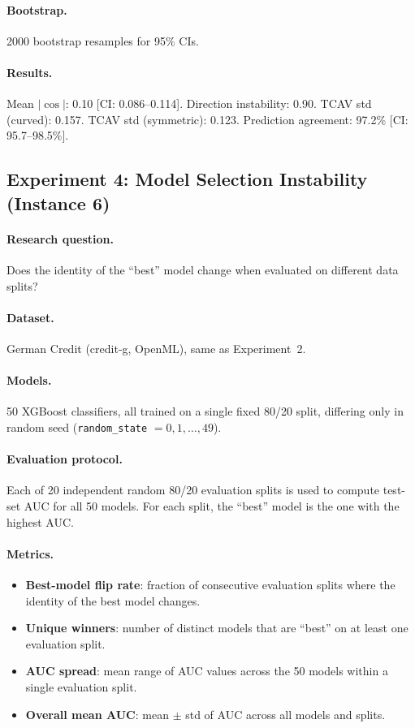\documentclass[11pt,a4paper]{article}
\begin{document}
\paragraph{Bootstrap.}
2000 bootstrap resamples for 95\% CIs.

\paragraph{Results.}
Mean $|\cos|$: 0.10 [CI: 0.086--0.114].  Direction instability: 0.90.
TCAV std (curved): 0.157.  TCAV std (symmetric): 0.123.  Prediction
agreement: 97.2\% [CI: 95.7--98.5\%].

\subsection{Experiment 4: Model Selection Instability (Instance 6)}
\label{app:exp-model-selection}

\paragraph{Research question.}
Does the identity of the ``best'' model change when evaluated on different
data splits?

\paragraph{Dataset.}
German Credit (credit-g, OpenML), same as Experiment~2.

\paragraph{Models.}
50 XGBoost classifiers, all trained on a single fixed 80/20 split, differing
only in random seed (\texttt{random\_state} $= 0, 1, \ldots, 49$).

\paragraph{Evaluation protocol.}
Each of 20 independent random 80/20 evaluation splits is used to compute
test-set AUC for all 50 models.  For each split, the ``best'' model is the
one with the highest AUC.

\paragraph{Metrics.}
\begin{itemize}[nosep]
  \item \textbf{Best-model flip rate}: fraction of consecutive evaluation
    splits where the identity of the best model changes.
  \item \textbf{Unique winners}: number of distinct models that are ``best''
    on at least one evaluation split.
  \item \textbf{AUC spread}: mean range of AUC values across the 50 models
    within a single evaluation split.
  \item \textbf{Overall mean AUC}: mean $\pm$ std of AUC across all
    models and splits.
\end{itemize}
\end{document}
